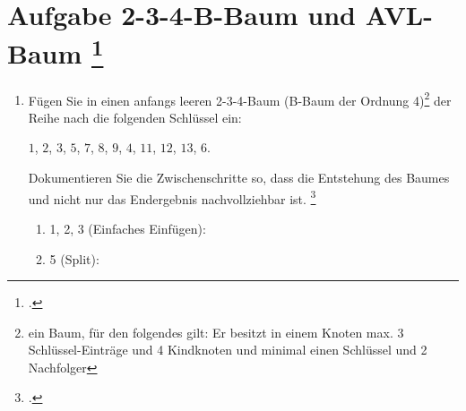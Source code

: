 \documentclass{bschlangaul-aufgabe}
\begin{document}

\section{Aufgabe 2-3-4-B-Baum und AVL-Baum
\footcite[entnommen aus Algorithmen und
Datenstrukturen, Übungsblatt 6, Universität Würzburg, Aufgabe 9]{aud:pu:7}}

\begin{enumerate}


\item Fügen Sie in einen anfangs leeren 2-3-4-Baum (B-Baum der Ordnung
4)\footnote{ein Baum, für den folgendes gilt: Er besitzt in einem Knoten
max. 3 Schlüssel-Einträge und 4 Kindknoten und minimal einen Schlüssel
und 2 Nachfolger} der Reihe nach die folgenden Schlüssel ein:

\bigskip

\centerline{$1$, $2$, $3$, $5$, $7$, $8$, $9$, $4$, $11$, $12$, $13$, $6$.}

\bigskip

Dokumentieren Sie die Zwischenschritte so,
dass die Entstehung des Baumes und nicht nur das Endergebnis
nachvollziehbar ist. \footcite[Staatsexamen Theoretische Informatik,
Algorithmen und Datenstrukturen, Realschulen, Frühjahr 2011, Thema 1
Aufgabe 3]{examen:46115:2011:03}

\begin{liAntwort}
\begin{multicols}{2}
\begin{enumerate}

%

\item 1, 2, 3 (Einfaches Einfügen):


%

\item 5 (Split):



\end{enumerate}
\end{multicols}
\end{liAntwort}
\end{enumerate}
\end{document}

